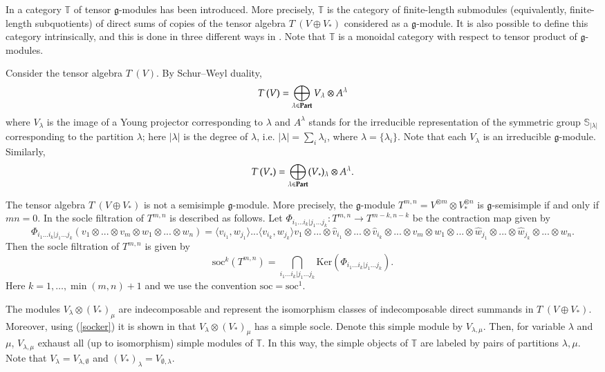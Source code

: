 \documentclass[11pt]{amsart}
\newcommand{\TT}{\mathbb{T}}
\renewcommand{\gg}{\mathfrak{g}}
\newcommand{\soc}{\mathrm{soc}}
\newcommand{\Ker}{\mathrm{Ker}}
\newcommand{\field}[1]{\mathbb{#1}}
\begin{document}
In \cite{DPS} a category $\mathbb T$ of tensor
$\gg$-modules has been introduced. More precisely, $\mathbb T$ is the
category of finite-length submodules (equivalently, finite-length
subquotients) of direct sums of copies of the tensor algebra
$T^\cdot(V\oplus V_*)$ considered as a $\gg$-module. It is also possible to define this category intrinsically,
and this is done in three different ways in \cite{DPS}. Note that
$\mathbb T$ is a monoidal category with respect to tensor product of $\gg$-modules.


Consider the tensor algebra $T^\cdot (V)$. By Schur--Weyl duality,
$$T^\cdot (V)=\bigoplus_{\lambda\in\bold{Part}}V_\lambda\otimes A^\lambda$$
where $V_\lambda$ is the image of a Young projector corresponding to
$\lambda$ and $A^\lambda$ stands for the irreducible
representation of the symmetric group $\field{S}_{|\lambda|}$ corresponding to
the partition $\lambda$; here $|\lambda|$ is the degree of $\lambda$,
i.e. $|\lambda|=\sum_{i}\lambda_i$, where
$\lambda=\{\lambda_i\}$. Note that each $V_\lambda$ is an irreducible
$\gg$-module. Similarly,
$$T^\cdot (V_*)=\bigoplus_{\lambda\in\bold{Part}}(V_*)_\lambda\otimes A^\lambda.$$

The tensor algebra $T^\cdot(V\oplus V_*)$ is not a semisimple
$\gg$-module. More precisely, the $\gg$-module $T^{m,n}=V^{\otimes m}\otimes V_*^{\otimes n}$
is $\gg$-semisimple if and only if $mn=0$. In \cite{PStyr} the socle
filtration of $T^{m,n}$ is described as follows. 
Let $\Phi_{i_1...i_k|j_1...j_k}: T^{m,n}\rightarrow T^{m-k,n-k}$
be the contraction map given by 
$$\Phi_{i_1...i_k|j_1...j_k}(v_1\otimes ...\otimes v_m\otimes w_1\otimes ...\otimes w_n)=\langle v_{i_1}, w_{j_1} \rangle ...\langle v_{i_k}, w_{j_k} \rangle v_1\otimes ...\otimes\hat{v}_{i_1}\otimes ...\otimes\hat{v}_{i_k}\otimes ...\otimes v_m\otimes w_1\otimes ...\otimes\hat{w}_{j_1}\otimes ...\otimes\hat{w}_{j_k}\otimes ...\otimes w_n.$$
Then the socle filtration of $T^{m,n}$ is given by
\begin{equation}\label{socker}
\soc^{k}(T^{m,n})=\bigcap_{i_1...i_k|j_1...j_k}\Ker(\Phi_{i_1...i_k|j_1...j_k}).
\end{equation}
Here $k=1,\dots,\operatorname{min}(m,n)+1$ and we use the convention $\soc=\soc^1$.

The modules $V_\lambda\otimes(V_*)_\mu$ are indecomposable and represent
the isomorphism classes of indecomposable direct summands in
$T^\cdot(V\oplus V_*)$. Moreover, using (\ref{socker}) it is shown in
\cite{PStyr} that $V_\lambda\otimes (V_*)_\mu$ has a simple
socle. Denote this simple module by $V_{\lambda,\mu}$. Then, for variable $\lambda$ and $\mu$,
$V_{\lambda,\mu}$ exhaust all (up to isomorphism) simple modules of
$\TT$. In this
way, the simple objects of $\mathbb T$ are labeled by pairs of
partitions $\lambda,\mu$. Note that 
$V_\lambda=V_{\lambda,\emptyset}$ and $(V_*)_\lambda=V_{\emptyset,\lambda}$.
\end{document}
